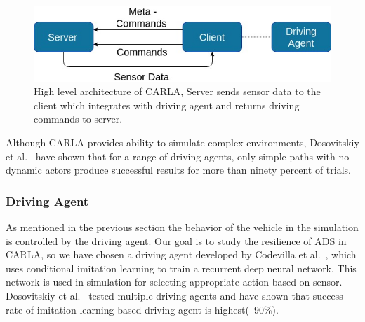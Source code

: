  \begin{figure}  [h]
 	\vspace{-0.5em}
 	\centering
 	\includegraphics[scale=0.4]{CARLA_block}
 	\vspace{-0.5em}
 	\caption{High level architecture of CARLA, Server sends sensor data to the client which integrates with driving agent and returns driving commands to server.}
 	\label{fig:carla_arch}
 	\vspace{-1.5em}
 \end{figure}
 
 \bigskip
 
 
 Although CARLA provides ability to simulate complex environments, Dosovitskiy et al.~\cite{Dosovitskiy17} have shown that for a range of driving agents, only simple paths with no dynamic actors produce successful results for more than ninety percent of trials.
 
 \medskip
 
 \subsubsection{Driving Agent}
 As mentioned in the previous section the behavior of the vehicle in the simulation is controlled by the driving agent. Our goal is to study the resilience of ADS in CARLA, so we have chosen a driving agent developed by Codevilla et al.~\cite{Codevilla2018}, which uses conditional imitation learning to train a recurrent deep neural network. This network is used in simulation for selecting appropriate action based on sensor. Dosovitskiy et al.~\cite{Dosovitskiy17} tested multiple driving agents and have shown that success rate of imitation learning based driving agent is highest(~90\%).
 
